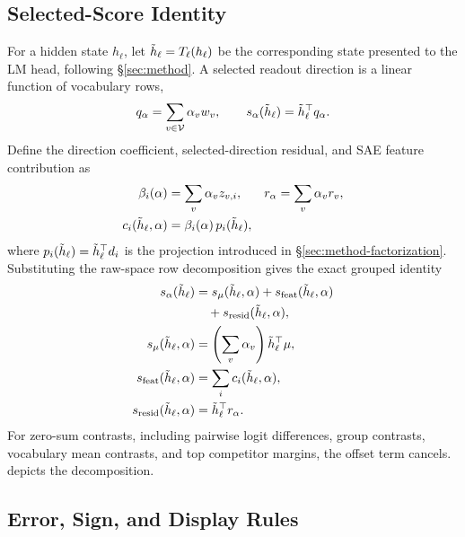\subsection{Selected-Score Identity}
\label{app:score-decomposition-selected-score}

For a hidden state \(h_\ell\), let
\(\tilde h_\ell=T_\ell(h_\ell)\) be the corresponding state presented to
the LM head, following \S\ref{sec:method}. A selected readout direction is
a linear function of vocabulary rows,
\[
    q_\alpha = \sum_{v\in\mathcal{V}} \alpha_v w_v,
    \qquad
    s_\alpha(\tilde h_\ell)=\tilde h_\ell^\top q_\alpha .
\]
Define the direction coefficient, selected-direction residual, and SAE
feature contribution as
\[
\begin{aligned}
    \beta_i(\alpha)&=\sum_v \alpha_v z_{v,i},
    & r_\alpha&=\sum_v\alpha_v r_v,\\
    c_i(\tilde h_\ell,\alpha)&=\beta_i(\alpha)\,p_i(\tilde h_\ell),
\end{aligned}
\]
where \(p_i(\tilde h_\ell)=\tilde h_\ell^\top d_i\) is the projection
introduced in \S\ref{sec:method-factorization}.
Substituting the raw-space row decomposition gives the exact grouped identity
\[
\begin{aligned}
    s_\alpha(\tilde h_\ell)
    &=
    s_{\mu}(\tilde h_\ell,\alpha)
    +s_{\mathrm{feat}}(\tilde h_\ell,\alpha)\\
    &\quad
    +s_{\mathrm{resid}}(\tilde h_\ell,\alpha),\\
    s_{\mu}(\tilde h_\ell,\alpha)
    &=
    \left(\sum_v \alpha_v\right)\tilde h_\ell^\top\mu,\\
    s_{\mathrm{feat}}(\tilde h_\ell,\alpha)
    &=
    \sum_i c_i(\tilde h_\ell,\alpha),\\
    s_{\mathrm{resid}}(\tilde h_\ell,\alpha)
    &=
    \tilde h_\ell^\top r_\alpha .
\end{aligned}
\]
For zero-sum contrasts, including pairwise logit differences, group contrasts,
vocabulary mean contrasts, and top competitor margins, the offset term
cancels.  depicts the decomposition.

\subsection{Error, Sign, and Display Rules}
\label{app:score-decomposition-fidelity}
\label{app:display-taxonomy}
\label{app:display-residual-decomposition}

